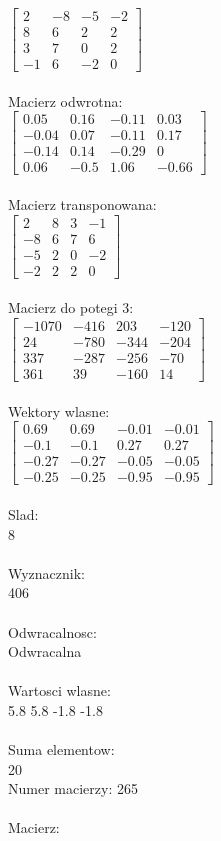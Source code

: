 \documentclass[a4paper,12pt]{article}
\begin{document}
$\begin{bmatrix} 2&-8&-5&-2\\8&6&2&2\\3&7&0&2\\-1&6&-2&0 \end{bmatrix}$
\\
\\
Macierz odwrotna:\\

$\begin{bmatrix} 0.05&0.16&-0.11&0.03\\-0.04&0.07&-0.11&0.17\\-0.14&0.14&-0.29&0\\0.06&-0.5&1.06&-0.66 \end{bmatrix}$
\\
\\
Macierz transponowana:\\

$\begin{bmatrix} 2&8&3&-1\\-8&6&7&6\\-5&2&0&-2\\-2&2&2&0 \end{bmatrix}$
\\
\\
Macierz do potegi 3:\\

$\begin{bmatrix} -1070&-416&203&-120\\24&-780&-344&-204\\337&-287&-256&-70\\361&39&-160&14 \end{bmatrix}$
\\
\\
Wektory wlasne:\\

$\begin{bmatrix} 0.69&0.69&-0.01&-0.01\\-0.1&-0.1&0.27&0.27\\-0.27&-0.27&-0.05&-0.05\\-0.25&-0.25&-0.95&-0.95 \end{bmatrix}$
\\
\\
Slad:\\
8
\\
\\
Wyznacznik:\\
406
\\
\\
Odwracalnosc:\\
Odwracalna
\\
\\
Wartosci wlasne:\\
5.8 5.8 -1.8 -1.8
\\
\\
Suma elementow:\\
20
\\
\newpage
Numer macierzy:
265
\\
\\
Macierz:\\
\end{document}
